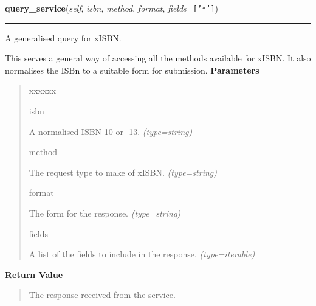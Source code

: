 \hspace{.8\funcindent}\begin{boxedminipage}{\funcwidth}

    \raggedright \textbf{query\_service}(\textit{self}, \textit{isbn}, \textit{method}, \textit{format}, \textit{fields}={\tt \texttt{[}\texttt{'}\texttt{*}\texttt{'}\texttt{]}})

    \vspace{-1.5ex}

    \rule{\textwidth}{0.5\fboxrule}
\setlength{\parskip}{2ex}

A generalised query for xISBN.

This serves a general way of accessing all the methods available for
xISBN. It also normalises the ISBn to a suitable form for submission.
\setlength{\parskip}{1ex}
      \textbf{Parameters}
      \vspace{-1ex}

      \begin{quote}
        \begin{Ventry}{xxxxxx}

          \item[isbn]


A normalised ISBN-10 or -13.
            {\it (type=string)}

          \item[method]


The request type to make of xISBN.
            {\it (type=string)}

          \item[format]


The form for the response.
            {\it (type=string)}

          \item[fields]


A list of the fields to include in the response.
            {\it (type=iterable)}

        \end{Ventry}

      \end{quote}

      \textbf{Return Value}
    \vspace{-1ex}

      \begin{quote}

The response received from the service.
      \end{quote}

    \end{boxedminipage}

